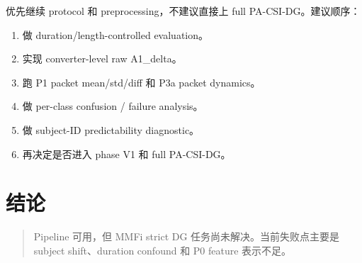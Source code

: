 \documentclass[UTF8,11pt]{ctexart}
\begin{document}
优先继续 protocol 和 preprocessing，不建议直接上 full PA-CSI-DG。建议顺序：

\begin{enumerate}
  \item 做 duration/length-controlled evaluation。
  \item 实现 converter-level raw A1\_delta。
  \item 跑 P1 packet mean/std/diff 和 P3a packet dynamics。
  \item 做 per-class confusion / failure analysis。
  \item 做 subject-ID predictability diagnostic。
  \item 再决定是否进入 phase V1 和 full PA-CSI-DG。
\end{enumerate}

\section{结论}

\begin{quote}
Pipeline 可用，但 MMFi strict DG 任务尚未解决。当前失败点主要是 subject shift、duration confound 和 P0 feature 表示不足。
\end{quote}
\end{document}
